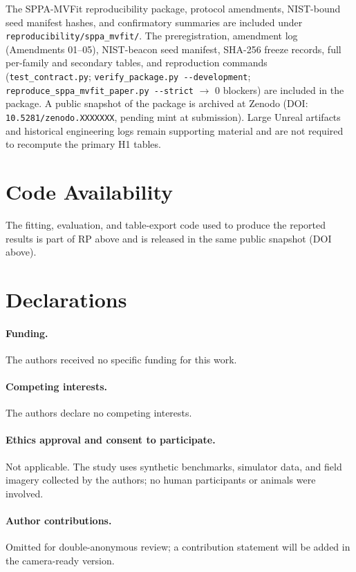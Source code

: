 \documentclass[11pt,a4paper]{article}
\begin{document}
{\sloppy
The SPPA-MVFit reproducibility package, protocol amendments, NIST-bound seed
manifest hashes, and confirmatory summaries are included under
\texttt{reproducibility/\allowbreak sppa\_mvfit/}. The preregistration,
amendment log (Amendments 01--05), NIST-beacon seed manifest, SHA-256 freeze
records, full per-family and secondary tables, and reproduction commands
(\texttt{test\_contract.py}; \texttt{verify\_package.py -{}-development};
\texttt{reproduce\_sppa\_mvfit\_paper.py -{}-strict} \(\to\) 0 blockers) are
included in the package. A public snapshot of the package is archived at
Zenodo (DOI: \texttt{10.5281/zenodo.XXXXXXX}, pending mint at submission).
Large Unreal artifacts and historical
engineering logs remain supporting material and are not required to recompute
the primary H1 tables.
\par}

\section*{Code Availability}

The fitting, evaluation, and table-export code used to produce the reported
results is part of RP above and is released in the same public snapshot
(DOI above).

\section*{Declarations}

\paragraph{Funding.} The authors received no specific funding for this work.

\paragraph{Competing interests.} The authors declare no competing interests.

\paragraph{Ethics approval and consent to participate.} Not applicable. The
study uses synthetic benchmarks, simulator data, and field imagery collected
by the authors; no human participants or animals were involved.

\paragraph{Author contributions.} Omitted for double-anonymous review; a
contribution statement will be added in the camera-ready version.

{\footnotesize


}
\end{document}
